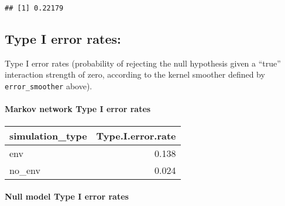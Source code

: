 \documentclass[11pt,]{article}
\newenvironment{Shaded}{\begin{snugshade}}{\end{snugshade}}
\newcommand{\KeywordTok}[1]{\textcolor[rgb]{0.13,0.29,0.53}{\textbf{{#1}}}}
\newcommand{\DataTypeTok}[1]{\textcolor[rgb]{0.13,0.29,0.53}{{#1}}}
\newcommand{\DecValTok}[1]{\textcolor[rgb]{0.00,0.00,0.81}{{#1}}}
\newcommand{\StringTok}[1]{\textcolor[rgb]{0.31,0.60,0.02}{{#1}}}
\newcommand{\NormalTok}[1]{{#1}}
\let\oldparagraph\paragraph
\renewcommand{\paragraph}[1]{\oldparagraph{#1}\mbox{}}
\begin{document}
\begin{verbatim}
## [1] 0.22179
\end{verbatim}

\subsection{Type I error rates:}\label{type-i-error-rates}

Type I error rates (probability of rejecting the null hypothesis given a
``true'' interaction strength of zero, according to the kernel smoother
defined by \texttt{error\_smoother} above).

\paragraph{Markov network Type I error
rates}\label{markov-network-type-i-error-rates}

\begin{Shaded}
\end{Shaded}

\begin{longtable}[c]{@{}lr@{}}
\toprule
simulation\_type & Type.I.error.rate\tabularnewline
\midrule
\endhead
env & 0.138\tabularnewline
no\_env & 0.024\tabularnewline
\bottomrule
\end{longtable}

\paragraph{Null model Type I error
rates}\label{null-model-type-i-error-rates}
\end{document}
